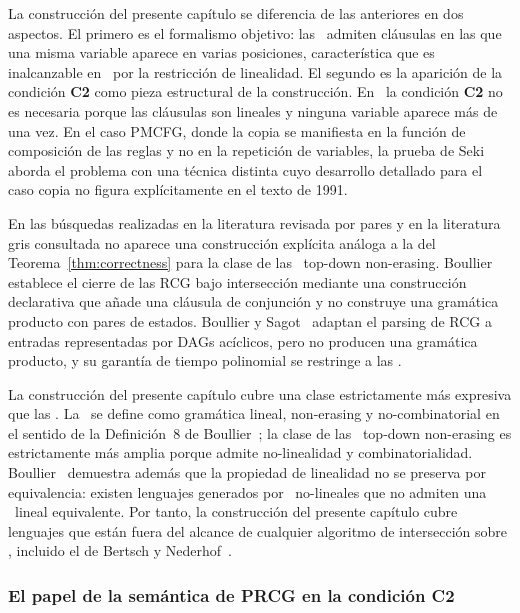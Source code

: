 La construcción del presente capítulo se diferencia de las anteriores en dos aspectos. El primero es el formalismo objetivo: las \PRCG\ admiten cláusulas en las que una misma variable aparece en varias posiciones, característica que es inalcanzable en \sRCG\ por la restricción de linealidad. El segundo es la aparición de la condición \textbf{C2} como pieza estructural de la construcción. En \sRCG\ la condición \textbf{C2} no es necesaria porque las cláusulas son lineales y ninguna variable aparece más de una vez. En el caso PMCFG, donde la copia se manifiesta en la función de composición de las reglas y no en la repetición de variables, la prueba de Seki~\cite{REF} aborda el problema con una técnica distinta cuyo desarrollo detallado para el caso copia no figura explícitamente en el texto de 1991.

En las búsquedas realizadas en la literatura revisada por pares y en la literatura gris consultada no aparece una construcción explícita análoga a la del Teorema~\ref{thm:correctness} para la clase de las \PRCG\ top-down non-erasing. Boullier~\cite{REF} establece el cierre de las RCG bajo intersección mediante una construcción declarativa que añade una cláusula de conjunción y no construye una gramática producto con pares de estados. Boullier y Sagot~\cite{REF} adaptan el parsing de RCG a entradas representadas por DAGs acíclicos, pero no producen una gramática producto, y su garantía de tiempo polinomial se restringe a las \sRCG.

La construcción del presente capítulo cubre una clase estrictamente más expresiva que las \sRCG. La \sRCG\ se define como gramática lineal, non-erasing y no-combinatorial en el sentido de la Definición~8 de Boullier~\cite{REF}; la clase de las \PRCG\ top-down non-erasing es estrictamente más amplia porque admite no-linealidad y combinatorialidad. Boullier~\cite{REF} demuestra además que la propiedad de linealidad no se preserva por equivalencia: existen lenguajes generados por \PRCG\ no-lineales que no admiten una \PRCG\ lineal equivalente. Por tanto, la construcción del presente capítulo cubre lenguajes que están fuera del alcance de cualquier algoritmo de intersección sobre \sRCG, incluido el de Bertsch y Nederhof~\cite{REF}.

\subsubsection{El papel de la semántica de PRCG en la condición \texorpdfstring{\textbf{C2}}{C2}}

